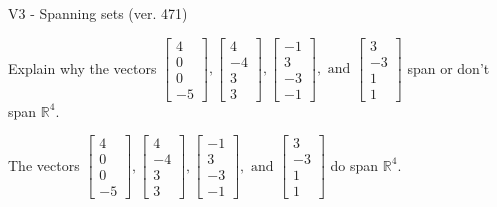 \begin{exercise}
  \begin{exerciseTitle}V3 - Spanning sets (ver. 471)\end{exerciseTitle}
  \begin{exerciseStatement}
    Explain why the vectors \(\left[\begin{array}{r}
4 \\
0 \\
0 \\
-5
\end{array}\right] , \left[\begin{array}{r}
4 \\
-4 \\
3 \\
3
\end{array}\right] , \left[\begin{array}{r}
-1 \\
3 \\
-3 \\
-1
\end{array}\right] , \text{ and } \left[\begin{array}{r}
3 \\
-3 \\
1 \\
1
\end{array}\right]\) span or don't span \(\mathbb{R}^4\). 
	


  \end{exerciseStatement}
  \begin{exerciseAnswer}
   The vectors \(\left[\begin{array}{r}
4 \\
0 \\
0 \\
-5
\end{array}\right] , \left[\begin{array}{r}
4 \\
-4 \\
3 \\
3
\end{array}\right] , \left[\begin{array}{r}
-1 \\
3 \\
-3 \\
-1
\end{array}\right] , \text{ and } \left[\begin{array}{r}
3 \\
-3 \\
1 \\
1
\end{array}\right]\) 
  	 do  
	span \(\mathbb{R}^4\).
  


  \end{exerciseAnswer}
\end{exercise}